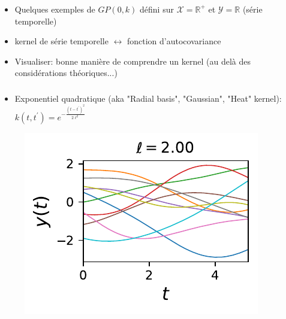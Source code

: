\documentclass[xcolor=svgnames, t]{beamer}
\begin{document}
\begin{frame}
  \frametitle{\secname}
  \begin{itemize}
    \item Quelques exemples de $GP(0, k)$ défini sur $\mathcal{X} = \mathbb{R}^+$ et $\mathcal{Y} = \mathbb{R}$
    (série temporelle)
    \item kernel de série temporelle $\leftrightarrow$ fonction d'autocovariance
    \item Visualiser: bonne manière de comprendre un kernel (au delà des considérations théoriques...)
  \end{itemize}  
\end{frame}

\begin{frame}
  \frametitle{\secname}
  \begin{itemize}
    \item Exponentiel quadratique (aka "Radial basis", "Gaussian", "Heat" kernel):
    $k (t, t^\prime) = e^{- \frac{(t - t^\prime)^2}{2 \ell^2} }$
  \end{itemize}
  \begin{figure}
    \includegraphics{10_gp_time_SquaredExponentialKernel_2.00.pdf}
  \end{figure}
\end{frame}
\end{document}
